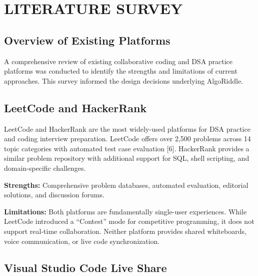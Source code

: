 \documentclass[12pt,a4paper,oneside]{report}
\begin{document}



\chapter{LITERATURE SURVEY}

\section{Overview of Existing Platforms}

A comprehensive review of existing collaborative coding and DSA practice platforms was conducted to identify the strengths and limitations of current approaches. This survey informed the design decisions underlying AlgoRiddle.

\section{LeetCode and HackerRank}

LeetCode and HackerRank are the most widely-used platforms for DSA practice and coding interview preparation. LeetCode offers over 2,500 problems across 14 topic categories with automated test case evaluation [6]. HackerRank provides a similar problem repository with additional support for SQL, shell scripting, and domain-specific challenges.

\textbf{Strengths:} Comprehensive problem databases, automated evaluation, editorial solutions, and discussion forums.

\textbf{Limitations:} Both platforms are fundamentally single-user experiences. While LeetCode introduced a ``Contest'' mode for competitive programming, it does not support real-time collaboration. Neither platform provides shared whiteboards, voice communication, or live code synchronization.

\section{Visual Studio Code Live Share}
\end{document}
